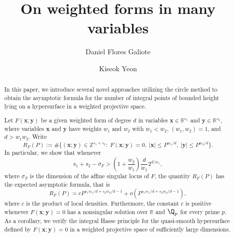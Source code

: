 \documentclass[12pt,reqno]{amsart}
\theoremstyle{definition}
\theoremstyle{remark}
\numberwithin{equation}{section}
\def\bfx{{\mathbf x}}
\def\bfy{{\mathbf y}}
\begin{document}
\title[On weighted forms in many variables]{On weighted forms in many variables}
\author[Daniel Flores Galiote]{Daniel Flores Galiote}
\author[Kiseok Yeon]{Kiseok Yeon}
\address{Department of Mathematics, Rice University}
\address{Department of Mathematics, University of California, Davis, United States}
\date{}
\dedicatory{}

\begin{abstract}
    In this paper, we introduce several novel approaches utilizing the circle method to obtain 
    the asymptotic formula for the number of integral points of bounded height lying on a 
    hypersurface in a weighted projective space.
    
    Let $F(\bfx;\bfy)$ be a given weighted form of degree $d$ in variables 
    $\bfx\in \mathbb{R}^{s_1}$ and $\bfy\in \mathbb{R}^{s_2}$, where variables $\bfx$ and $\bfy$ 
    have weights $w_1$ and $w_2$ with $w_1< w_2$, $(w_1,w_2)=1$, and
    $d>w_1w_2$. Write 
    \begin{equation*}
        R_F(P):=\#\{(\bfx;\bfy)\in \mathbb{Z}^{s_1+s_2}:\ F(\bfx;\bfy)=0,\ 
        |\bfx|\leq P^{w_1/d},\ |\bfy|\leq P^{w_2/d}\}.
    \end{equation*}
   In particular, we show that whenever 
   \[
    s_1+s_2-\sigma_F>
    \left(1+\frac{w_2}{w_1}\right)
    \frac d{w_1}2^{d/w_1},
    \]
    where $\sigma_F$ is the dimension of the affine singular locus of $F$, the quantity 
   $R_F(P)$ has the expected asymptotic formula, that is 
   \[R_F(P)=cP^{s_1w_1/d+s_2w_2/d-1}+o(P^{s_1w_1/d+s_2w_2/d-1}),\]
    where $c$ is the product of local densities. Furthermore, the constant $c$ is positive whenever $F(\bfx;\bfy)=0$ has a nonsingular solution over $\mathbb{R}$ and $\Q_p$ for every prime $p$. As a corollary, we verify the integral Hasse principle for the quasi-smooth hypersurface defined by $F(\bfx;\bfy)=0$ in a weighted projective space of sufficiently large dimensions.
\end{abstract}
\maketitle
\end{document}
